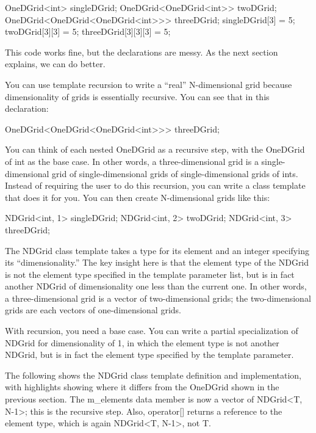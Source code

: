 \begin{cpp}
OneDGrid<int> singleDGrid;
OneDGrid<OneDGrid<int>> twoDGrid;
OneDGrid<OneDGrid<OneDGrid<int>>> threeDGrid;
singleDGrid[3] = 5;
twoDGrid[3][3] = 5;
threeDGrid[3][3][3] = 5;
\end{cpp}

This code works fine, but the declarations are messy. As the next section explains, we can do better.


You can use template recursion to write a “real” N-dimensional grid because dimensionality of grids is essentially recursive. You can see that in this declaration:

\begin{cpp}
OneDGrid<OneDGrid<OneDGrid<int>>> threeDGrid;
\end{cpp}

You can think of each nested OneDGrid as a recursive step, with the OneDGrid of int as the base case. In other words, a three-dimensional grid is a single-dimensional grid of single-dimensional grids of single-dimensional grids of ints. Instead of requiring the user to do this recursion, you can write a class template that does it for you. You can then create N-dimensional grids like this:

\begin{cpp}
NDGrid<int, 1> singleDGrid;
NDGrid<int, 2> twoDGrid;
NDGrid<int, 3> threeDGrid;
\end{cpp}

The NDGrid class template takes a type for its element and an integer specifying its “dimensionality.” The key insight here is that the element type of the NDGrid is not the element type specified in the template parameter list, but is in fact another NDGrid of dimensionality one less than the current one. In other words, a three-dimensional grid is a vector of two-dimensional grids; the two-dimensional grids are each vectors of one-dimensional grids.

With recursion, you need a base case. You can write a partial specialization of NDGrid for dimensionality of 1, in which the element type is not another NDGrid, but is in fact the element type specified by the template parameter.

The following shows the NDGrid class template definition and implementation, with highlights showing where it differs from the OneDGrid shown in the previous section. The m\_elements data member is now a vector of NDGrid<T, N-1>; this is the recursive step. Also, operator[] returns a reference to the element type, which is again NDGrid<T, N-1>, not T.

